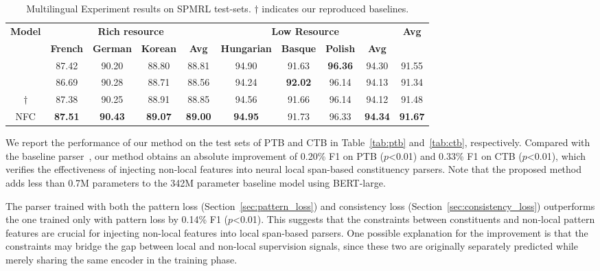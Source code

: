 \documentclass[11pt]{article}
\begin{document}
\begin{table*}[t!]
    \begin{center}
            \small
    \begin{tabular}{c|ccc|c|ccc|c|c}
        \hline
        \multirow{2}{*}{\bf Model} & \multicolumn{4}{c|}{\bf Rich resource} & \multicolumn{4}{c|}{\bf Low Resource} & \multirow{2}{*}{\bf Avg} \\
       \cline{2-9}
        & \bf French & \bf German & \bf Korean & \bf Avg & \bf Hungarian & \bf Basque & \bf Polish & \bf Avg & \\
        \hline
        \citet{san-constituency} & 87.42 & 90.20 & 88.80 & 88.81 & 94.90 & 91.63 & \bf 96.36 & 94.30 & 91.55 \\
         \citet{constituency-point} & 86.69 & 90.28 & 88.71 & 88.56 & 94.24  & \bf 92.02 & 96.14 & 94.13 & 91.34 \\
         \hline
        \citet{san-constituency} $\dagger$ & 87.38 & 90.25 & 88.91 & 88.85 & 94.56 & 91.66 & 96.14 & 94.12 & 91.48 \\
         NFC & \bf 87.51 & \bf 90.43 & \bf 89.07 & \bf 89.00 & \bf 94.95 & 91.73 & 96.33 & {\bf 94.34} &{\bf 91.67} \\
        \hline
    \end{tabular}
    \end{center}
    \caption{Multilingual Experiment results on SPMRL test-sets. $\dagger$ indicates our reproduced baselines.}
    \label{tab:multi-lingual}
\end{table*}


We report the performance of our method on the test sets of PTB and CTB in Table~\ref{tab:ptb} and~\ref{tab:ctb}, respectively. 
Compared with the baseline parser~\cite{san-constituency}, our method obtains an absolute improvement of 0.20\% F1 on PTB ($p$\textless0.01) and 0.33\% F1 on CTB ($p$\textless0.01), 
which verifies the effectiveness of injecting non-local features into neural local span-based constituency parsers. 
Note that the proposed method adds less than 0.7M parameters to the 342M parameter baseline model using \mbox{BERT-large}.

The parser trained with both the pattern loss (Section~\ref{sec:pattern_loss}) and consistency loss (Section~\ref{sec:consistency_loss}) outperforms the one trained only with pattern loss by 0.14\% F1 ($p$\textless0.01). 
This suggests that the constraints between constituents and non-local pattern features are crucial for injecting non-local features into local span-based parsers. 
One possible explanation for the improvement is that the constraints may bridge the gap between local and non-local supervision signals, since these two are originally separately predicted while merely sharing the same encoder in the training phase.
\end{document}
